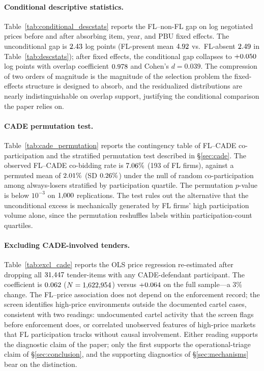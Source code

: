 \paragraph{Conditional descriptive statistics.}
Table~\ref{tab:conditional_descstats} reports the FL--non-FL
gap on log negotiated prices before and after absorbing item,
year, and PBU fixed effects. The unconditional gap is $2.43$
log points (FL-present mean $4.92$ vs.\ FL-absent $2.49$ in
Table~\ref{tab:descstats}); after fixed effects, the
conditional gap collapses to $+0.050$ log points with overlap
coefficient $0.978$ and Cohen's $d = 0.039$. The compression
of two orders of magnitude is the magnitude of the selection
problem the fixed-effects structure is designed to absorb,
and the residualized distributions are nearly indistinguishable
on overlap support, justifying the conditional comparison the
paper relies on.



\paragraph{CADE permutation test.}
Table~\ref{tab:cade_permutation} reports the contingency table
of FL--CADE co-participation and the stratified permutation
test described in \S\ref{sec:cade}. The observed FL--CADE
co-bidding rate is $7.06\%$ (193 of \valFL FL firms), against
a permuted mean of $2.01\%$ (SD $0.26\%$) under the null of
random co-participation among always-losers stratified by
participation quartile. The permutation $p$-value is below
$10^{-3}$ on $1{,}000$ replications. The test rules out the
alternative that the unconditional excess is mechanically
generated by FL firms' high participation volume alone, since
the permutation reshuffles labels within participation-count
quartiles.

\paragraph{Excluding CADE-involved tenders.}
Table~\ref{tab:excl_cade} reports the OLS price regression
re-estimated after dropping all $31{,}447$ tender-items with
any CADE-defendant participant. The coefficient is $0.062$
($N = 1{,}622{,}954$) versus $+0.064$ on the full sample---a
$3\%$ change. The FL--price association does not depend on the
enforcement record; the screen identifies high-price
environments outside the documented cartel cases, consistent
with two readings: undocumented cartel activity that the screen
flags before enforcement does, or correlated unobserved
features of high-price markets that FL participation tracks
without causal involvement. Either reading supports the
diagnostic claim of the paper; only the first supports the
operational-triage claim of \S\ref{sec:conclusion}, and the supporting
diagnostics of \S\ref{sec:mechanisms} bear on the
distinction.

